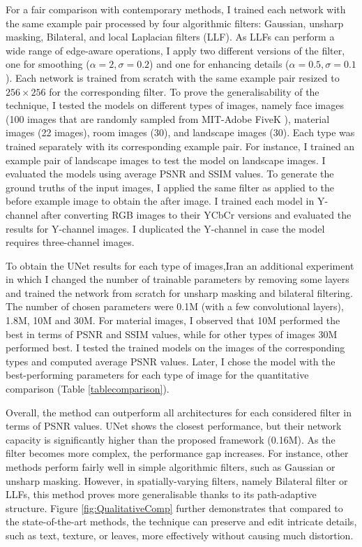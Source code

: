 For a fair comparison with contemporary methods, I trained each network with the same example pair processed by four algorithmic filters: Gaussian, unsharp masking, Bilateral, and local Laplacian filters (LLF). As LLFs can perform a wide range of edge-aware operations, I apply two different versions of the filter, one for smoothing ($\alpha=2,  \sigma=0.2$) and one for enhancing details ($\alpha=0.5, \sigma=0.1$). Each network is trained from scratch with the same example pair resized to $256 \times 256$ for the corresponding filter. 
To prove the generalisability of the technique, I tested the models on different types of images, namely face images (100 images that are randomly sampled from MIT-Adobe FiveK \cite{Bychkovsky11Learning}), material images (22 images), room images (30), and landscape images (30). Each type was trained separately with its corresponding example pair. For instance, I trained an example pair of landscape images to test the model on landscape images. I evaluated the models using average PSNR and SSIM values. To generate the ground truths of the input images, I applied the same filter as applied to the before example image to obtain the after image. I trained each model in Y-channel after converting RGB images to their YCbCr versions and evaluated the results for Y-channel images. I duplicated the Y-channel in case the model requires three-channel images. 


To obtain the UNet results for each type of images,Iran an additional experiment in which I changed the number of trainable parameters by removing some layers and trained the network from scratch for unsharp masking and bilateral filtering. The number of chosen parameters were 0.1M (with a few convolutional layers), 1.8M, 10M and 30M. For material images, I observed that 10M performed the best in terms of PSNR and SSIM values, while for other types of images 30M performed best. I tested the trained models on the images of the corresponding types and computed average PSNR values. Later, I chose the model with the best-performing parameters for each type of image for the quantitative comparison (Table \ref{tablecomparison}).

Overall, the method can outperform all architectures for each considered filter in terms of PSNR values. UNet shows the closest performance, but their network capacity is significantly higher than the proposed framework (0.16M). As the filter becomes more complex, the performance gap increases. For instance, other methods perform fairly well in simple algorithmic filters, such as Gaussian or unsharp masking. However, in spatially-varying filters, namely Bilateral filter or LLFs, this method proves more generalisable thanks to its path-adaptive structure. Figure \ref{fig:QualitativeComp} further demonstrates that compared to the state-of-the-art methods, the technique can preserve and edit intricate details, such as text, texture, or leaves, more effectively without causing much distortion. 



